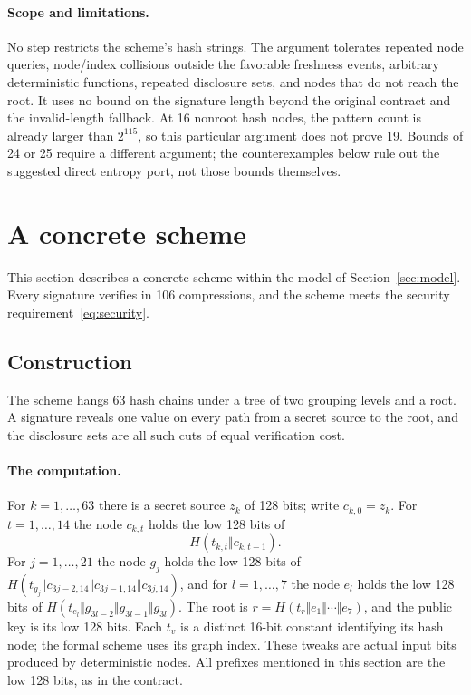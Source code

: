 \documentclass[10pt]{article}
\begin{document}
\paragraph{Scope and limitations.}
No step restricts the scheme's hash strings. The argument tolerates repeated node queries, node/index collisions outside the favorable freshness events, arbitrary deterministic functions, repeated disclosure sets, and nodes that do not reach the root. It uses no bound on the signature length beyond the original contract and the invalid-length fallback. At 16 nonroot hash nodes, the pattern count is already larger than $2^{115}$, so this particular argument does not prove 19. Bounds of 24 or 25 require a different argument; the counterexamples below rule out the suggested direct entropy port, not those bounds themselves.

\section{A concrete scheme}\label{sec:scheme}

This section describes a concrete scheme within the model of Section~\ref{sec:model}. Every signature verifies in 106 compressions, and the scheme meets the security requirement~\eqref{eq:security}.

\subsection{Construction}

The scheme hangs 63 hash chains under a tree of two grouping levels and a root. A signature reveals one value on every path from a secret source to the root, and the disclosure sets are all such cuts of equal verification cost.

\paragraph{The computation.}
For $k=1,\dots,63$ there is a secret source $z_k$ of 128 bits; write $c_{k,0}=z_k$. For $t=1,\dots,14$ the node $c_{k,t}$ holds the low 128 bits of
\[
H(t_{k,t}\Vert c_{k,t-1}).
\]
For $j=1,\dots,21$ the node $g_j$ holds the low 128 bits of $H(t_{g_j}\Vert c_{3j-2,14}\Vert c_{3j-1,14}\Vert c_{3j,14})$, and for $l=1,\dots,7$ the node $e_l$ holds the low 128 bits of $H(t_{e_l}\Vert g_{3l-2}\Vert g_{3l-1}\Vert g_{3l})$. The root is $r=H(t_r\Vert e_1\Vert\cdots\Vert e_7)$, and the public key is its low 128 bits. Each $t_v$ is a distinct 16-bit constant identifying its hash node; the formal scheme uses its graph index. These tweaks are actual input bits produced by deterministic nodes. All prefixes mentioned in this section are the low 128 bits, as in the contract.
\end{document}
